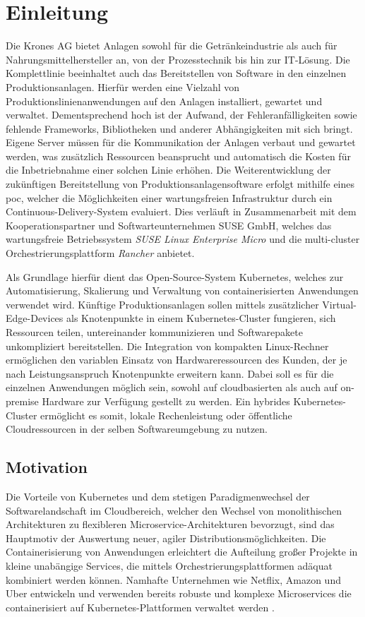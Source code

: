 \chapter{Einleitung}
Die Krones AG bietet Anlagen sowohl für die Getränkeindustrie als auch für
Nahrungsmittelhersteller an, von der Prozesstechnik bis hin zur IT-Lösung. 
Die Komplettlinie beeinhaltet auch das Bereitstellen von Software in den einzelnen Produktionsanlagen. 
Hierfür werden eine Vielzahl von Produktionslinienanwendungen auf den Anlagen installiert, gewartet
und verwaltet. Dementsprechend hoch ist der Aufwand, der Fehleranfälligkeiten sowie fehlende Frameworks, Bibliotheken
und anderer Abhängigkeiten mit sich bringt.
Eigene Server müssen für die Kommunikation der Anlagen verbaut und gewartet werden,
was zusätzlich Ressourcen beansprucht und automatisch die Kosten für die Inbetriebnahme einer solchen
Linie erhöhen. Die Weiterentwicklung der zukünftigen Bereitstellung von Produktionsanlagensoftware
erfolgt mithilfe eines \ac*{poc}, welcher die Möglichkeiten einer wartungsfreien Infrastruktur
durch ein Continuous-Delivery-System evaluiert. Dies verläuft in Zusammenarbeit mit dem
Kooperationspartner und Softwarteunternehmen SUSE GmbH, welches das wartungsfreie Betriebssystem
\textit{SUSE Linux Enterprise Micro} und die multi-cluster Orchestrierungsplattform \textit{Rancher} anbietet.

Als Grundlage hierfür dient das Open-Source-System Kubernetes, welches zur Automatisierung, Skalierung
und Verwaltung von containerisierten Anwendungen verwendet wird. Künftige Produktionsanlagen sollen mittels zusätzlicher Virtual-Edge-Devices
als Knotenpunkte in einem Kubernetes-Cluster fungieren, sich Ressourcen teilen, untereinander kommunizieren und Softwarepakete unkompliziert bereitstellen.
Die Integration von kompakten Linux-Rechner ermöglichen den variablen Einsatz von Hardwareressourcen des Kunden, der je nach Leistungsanspruch Knotenpunkte erweitern kann.
Dabei soll es für die einzelnen Anwendungen möglich sein, sowohl auf cloudbasierten als auch auf on-premise Hardware zur Verfügung gestellt zu werden.
Ein hybrides Kubernetes-Cluster ermöglicht es somit, lokale Rechenleistung oder öffentliche Cloudressourcen in der selben Softwareumgebung zu nutzen.
\section{Motivation}
Die Vorteile von Kubernetes und dem stetigen Paradigmenwechsel der Softwarelandschaft im Cloudbereich, welcher
den Wechsel von monolithischen Architekturen zu flexibleren Microservice-Architekturen
bevorzugt, sind das Hauptmotiv der Auswertung neuer, agiler Distributionsmöglichkeiten.
Die Containerisierung von Anwendungen erleichtert die Aufteilung großer Projekte
in kleine unabängige Services, die mittels Orchestrierungsplattformen adäquat kombiniert werden können.
Namhafte Unternehmen wie Netflix, Amazon und Uber entwickeln und verwenden
bereits robuste und komplexe Microservices die containerisiert auf Kubernetes-Plattformen
verwaltet werden \cite{microservice}. 

